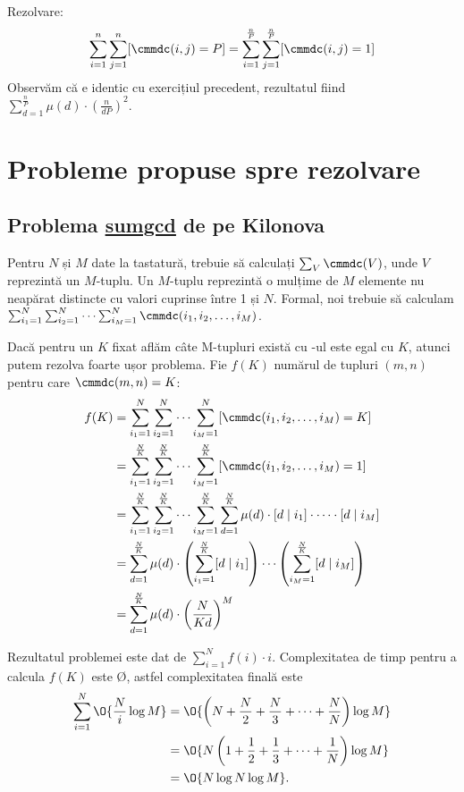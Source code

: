 Rezolvare: \begin{equation*}
    \sum_{i=1}^{n} \sum_{j=1}^{n} [\cmmdc(i,j) = P] = \sum_{i=1}^{\frac{n}{P}} \sum_{j=1}^{\frac{n}{P}} [\cmmdc(i,j) = 1]
\end{equation*}
Observăm că e identic cu exercițiul precedent, rezultatul fiind $\sum_{d=1}^{\frac{n}{P}} \mu(d) \cdot \left(\frac{n}{dP}\right)^2$.

\section{Probleme propuse spre rezolvare}
\subsection{Problema \href{https://kilonova.ro/problems/2004}{sumgcd} de pe Kilonova}

Pentru $N$ și $M$ date la tastatură, trebuie să calculați $\sum_{V} \cmmdc(V)$, unde $V$ reprezintă un $M$-tuplu. Un $M$-tuplu reprezintă o mulțime de $M$ elemente nu neapărat distincte cu valori cuprinse între 1 și $N$. Formal, noi trebuie să calculam $\sum_{i_1 = 1}^{N} \sum_{i_2 = 1}^{N} \dots \sum_{i_M = 1}^{N} \cmmdc(i_1, i_2, \dots, i_M)$.

Dacă pentru un $K$ fixat aflăm câte M-tupluri există cu \cmmdc-ul este egal cu $K$, atunci putem rezolva foarte ușor problema. Fie $f(K)$ numărul de tupluri $(m, n)$ pentru care $\cmmdc(m, n) = K$:
\begin{align*}
    f(K) &= \sum_{i_1 = 1}^{N} \sum_{i_2 = 1}^{N} \dots \sum_{i_M = 1}^{N} [\cmmdc(i_1, i_2, \dots, i_M) = K]\\
    &= \sum_{i_1 = 1}^{\frac{N}{K}} \sum_{i_2 = 1}^{\frac{N}{K}} \dots \sum_{i_M = 1}^{\frac{N}{K}} [\cmmdc(i_1, i_2, \dots, i_M) = 1]\\
    &= \sum_{i_1 = 1}^{\frac{N}{K}} \sum_{i_2 = 1}^{\frac{N}{K}} \dots \sum_{i_M = 1}^{\frac{N}{K}} \sum_{d = 1}^{\frac{N}{K}} \mu(d) \cdot [d\mid i_1] \cdot \dots \cdot [d\mid i_M]\\
    &= \sum_{d = 1}^{\frac{N}{K}} \mu(d) \cdot \left(\sum_{i_1 = 1}^{\frac{N}{K}} [d\mid i_1]\right) \cdots \left(\sum_{i_M = 1}^{\frac{N}{K}} [d\mid i_M]\right)\\
    &= \sum_{d = 1}^{\frac{N}{K}} \mu(d) \cdot \left(\frac{N}{Kd}\right)^M
\end{align*}

Rezultatul problemei este dat de $\sum_{i=1}^{N} f(i) \cdot i$. Complexitatea de timp pentru a calcula $f(K)$ este \O{}, astfel complexitatea finală  este 
\begin{align*}
    \sum_{i=1}^{N} \O{\frac{N}{i} \log{M}} 
    &= \O{\left(N + \frac{N}{2} + \frac{N}{3} + \cdots + \frac{N}{N}\right) \log{M}}\\
    &= \O{N \left(1 + \frac{1}{2} + \frac{1}{3} + \cdots + \frac{1}{N}\right) \log{M}}\\
    &= \O{N\log{N}\log{M}}.
\end{align*}

